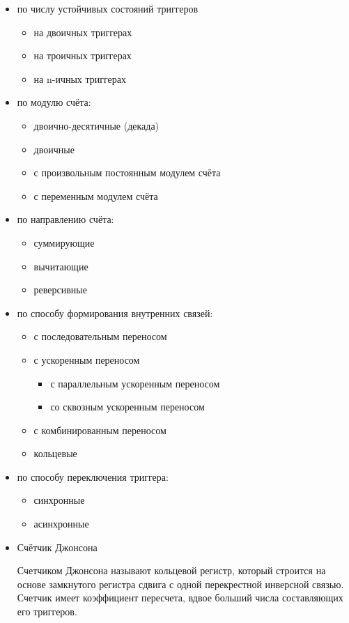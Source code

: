 \begin{itemize}
\item по числу устойчивых состояний триггеров
	\begin{itemize}
	\item на двоичных триггерах
	\item на троичных триггерах
	\item на n-ичных триггерах
	\end{itemize}
\item по модулю счёта:
	\begin{itemize}
	\item двоично-десятичные (декада)
	\item двоичные
	\item с произвольным постоянным модулем счёта
	\item с переменным модулем счёта
	\end{itemize}
\item по направлению счёта:
	\begin{itemize}
	\item суммирующие
	\item вычитающие
	\item реверсивные
	\end{itemize}
\item по способу формирования внутренних связей:
	\begin{itemize}
	\item с последовательным переносом
	\item с ускоренным переносом
		\begin{itemize}
		\item с параллельным ускоренным переносом
		\item со сквозным ускоренным переносом
		\end{itemize}
	\item с комбинированным переносом
	\item кольцевые
	\end{itemize}
\item по способу переключения триггера:
	\begin{itemize}
	\item синхронные
	\item асинхронные
	\end{itemize}
\item Счётчик Джонсона
	\par Счетчиком Джонсона называют кольцевой регистр, который строится на основе замкнутого регистра сдвига с одной перекрестной инверсной связью. Счетчик имеет коэффициент пересчета, вдвое больший числа составляющих его триггеров.
\end{itemize}


